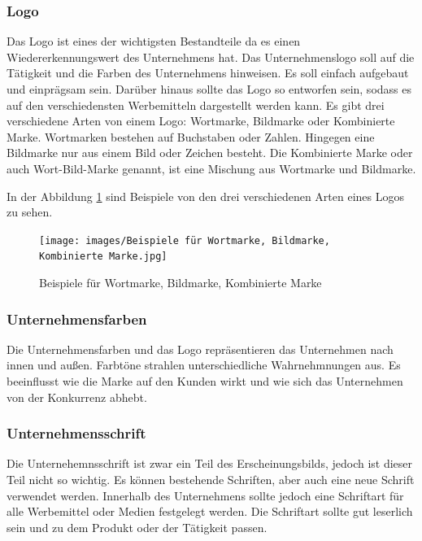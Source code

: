 \subsubsection{Logo}
Das Logo ist eines der wichtigsten Bestandteile da es einen Wiedererkennungswert des Unternehmens hat. Das Unternehmenslogo soll auf die Tätigkeit und die Farben des Unternehmens hinweisen. Es soll einfach aufgebaut  und einprägsam sein. Darüber hinaus sollte das Logo so entworfen sein, sodass es auf den verschiedensten Werbemitteln dargestellt werden kann. Es gibt drei verschiedene Arten von einem Logo: Wortmarke, Bildmarke oder Kombinierte Marke. Wortmarken bestehen auf Buchstaben oder Zahlen. Hingegen eine Bildmarke nur aus einem Bild oder Zeichen besteht. Die Kombinierte Marke oder auch Wort-Bild-Marke genannt, ist eine Mischung aus Wortmarke und Bildmarke. \parencite{Firmenlogo} 

In der Abbildung \ref{fig:Beispiele für Wortmarke, Bildmarke, Kombinierte Marke} sind Beispiele von den drei verschiedenen Arten eines Logos zu sehen.

\begin{figure}[H]
	\centering
	\texttt{[image: images/Beispiele für Wortmarke, Bildmarke, Kombinierte Marke.jpg]}
	\caption[Beispiele für Wortmarke, Bildmarke, Kombinierte Marke]{Beispiele für Wortmarke, Bildmarke, Kombinierte Marke}
	\label{fig:Beispiele für Wortmarke, Bildmarke, Kombinierte Marke}\parencite{Logodesign}
\end{figure}

\subsubsection{Unternehmensfarben}
Die Unternehmensfarben und das Logo repräsentieren das Unternehmen nach innen und außen. Farbtöne strahlen unterschiedliche Wahrnehmnungen aus. Es beeinflusst wie die Marke auf den Kunden wirkt und wie sich das Unternehmen von der Konkurrenz abhebt. \parencite{Unternehmensfarbe}

\subsubsection{Unternehmensschrift}
Die Unternehemnsschrift ist zwar ein Teil des Erscheinungsbilds, jedoch ist dieser Teil nicht so wichtig. Es können bestehende Schriften, aber auch eine neue Schrift verwendet werden. Innerhalb des Unternehmens sollte jedoch eine Schriftart für alle Werbemittel oder Medien festgelegt werden. Die Schriftart sollte gut leserlich sein und zu dem Produkt oder der Tätigkeit passen. \parencite{Unternehmensschrift}

